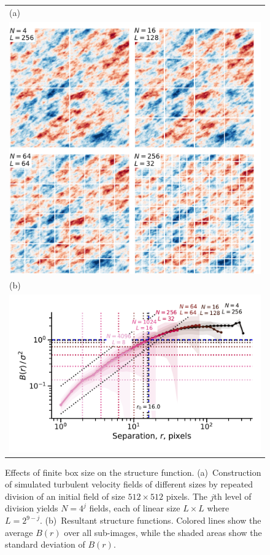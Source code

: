 \documentclass[fleqn,usenatbib, useAMS, a4paper]{mnras}
\begin{document}
\begin{figure}
  \begin{tabular}{@{} l @{}}
    (a)\\
    \includegraphics[width=\linewidth]{Figures/fake-finite-box-images}
    \\[\bigskipamount]
    (b)\\
    \includegraphics[width=\linewidth]{Figures/fake-finite-box-strucfunc2}
  \end{tabular}
  \caption{Effects of finite box size on the structure function.
    (a)~Construction of simulated turbulent velocity fields of different sizes
    by repeated division of an initial field of size \(512 \times 512\) pixels.
    The \(j\)th level of division yields \(N = 4^j\) fields,
    each of linear size \(L \times L\) where \(L = 2^{9 - j}\). 
    (b)~Resultant structure functions.
    Colored lines show the average \(B(r)\) over all sub-images,
    while the shaded areas show the standard deviation of \(B(r)\).
  }
  \label{fig:finite-box}
\end{figure}
\end{document}
